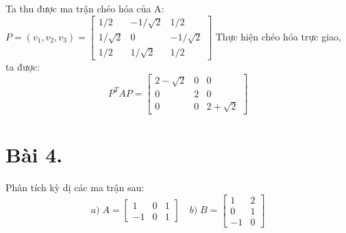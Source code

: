 \documentclass{article}
\begin{document}
Ta thu được ma trận chéo hóa của A: \(
P = (v_1, v_2, v_3) = \begin{bmatrix}
    1/2       & -1/ \sqrt2 & 1/2        \\
    1/ \sqrt2 & 0          & -1/ \sqrt2 \\
    1/2       & 1/ \sqrt2  & 1/2
\end{bmatrix} \)
\newline Thực hiện chéo hóa trực giao, ta được:
\[
    P^TAP = \begin{bmatrix}
        2 - \sqrt2 & 0 & 0 \\ 0 & 2 & 0 \\ 0 & 0 & 2 + \sqrt2
    \end{bmatrix}
\]

\section*{Bài 4.} \large {Phân tích kỳ dị các ma trận sau:}
\[
    a) \; A =
    \begin{bmatrix}
        1 & 0 & 1 \\ -1 & 0 & 1
    \end{bmatrix}
    \quad
    b) \; B =
    \begin{bmatrix}
        1 & 2 \\ 0 & 1 \\ -1 & 0
    \end{bmatrix}
\]
\end{document}

